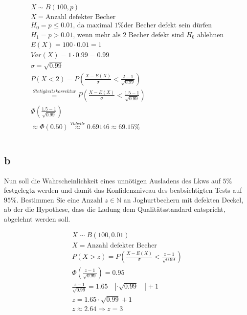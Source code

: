 \begin{align*}
    X \sim B(100, p)                                                                                      \\
    X = \text{Anzahl defekter Becher}                                                                     \\
    H_0 = p \leq 0.01 \text{, da maximal 1\% der Becher defekt sein dürfen}                               \\
    H_1 = p > 0.01 \text{, wenn mehr als 2 Becher defekt sind }H_0 \text{ ablehnen}                       \\
    E(X) = 100 \cdot 0.01 = 1                                                                             \\
    Var(X) = 1 \cdot 0.99 = 0.99                                                                          \\
    \sigma = \sqrt{0.99}                                                                                  \\
    P(X < 2) = P\left(\frac{X - E(X)}{\sigma} < \frac{2 - 1}{\sqrt{0.99}}\right)                          \\
    \overset{Stetigkeitskorrektur}{=} P\left(\frac{X - E(X)}{\sigma} < \frac{1.5 - 1}{\sqrt{0.99}}\right) \\
    \Phi\left(\frac{1.5 - 1}{\sqrt{0.99}}\right)                                                          \\
    \approx \Phi(0.50) \overset{Tabelle}{\approx} 0.69146 \approx 69.15 \%                                \\\\
\end{align*}

\subsection{b}

Nun soll die Wahrscheinlichkeit eines unnötigen Ausladens des Lkws auf $5\%$
festgelegtz werden und damit das Konfidenzniveau des beabsichtigten Tests auf
$95\%$. Bestimmen Sie eine Anzahl $z \in \mathbb{N}$ an Joghurtbechern mit
defekten Deckel, ab der die Hypothese, dass die Ladung dem Qualitätsstandard
entspricht, abgelehnt werden soll.

\begin{align*}
    X \sim B(100, 0.01)                                                          \\
    X = \text{Anzahl defekter Becher}                                            \\
    P(X > z) = P\left(\frac{X - E(X)}{\sigma} < \frac{z - 1}{\sqrt{0.99}}\right) \\
    \Phi\left(\frac{z - 1}{\sqrt{0.99}}\right) = 0.95                            \\
    \frac{z - 1}{\sqrt{0.99}} = 1.65 \quad | \cdot \sqrt{0.99} \quad | + 1       \\
    z = 1.65 \cdot \sqrt{0.99} + 1                                               \\
    z \approx 2.64 \Rightarrow z = 3
\end{align*}

